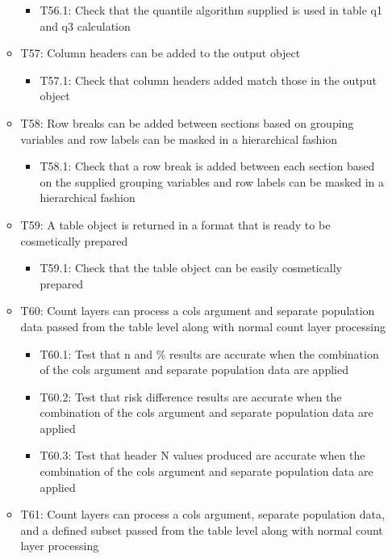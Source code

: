 \documentclass[
]{article}
\providecommand{\tightlist}{%
  \setlength{\itemsep}{0pt}\setlength{\parskip}{0pt}}
\begin{document}
\begin{itemize}
\begin{itemize}
    \begin{itemize}
    \tightlist
    \item
      T56.1: Check that the quantile algorithm supplied is used in table
      q1 and q3 calculation
    \end{itemize}
  \item
    T57: Column headers can be added to the output object

    \begin{itemize}
    \tightlist
    \item
      T57.1: Check that column headers added match those in the output
      object
    \end{itemize}
  \item
    T58: Row breaks can be added between sections based on grouping
    variables and row labels can be masked in a hierarchical fashion

    \begin{itemize}
    \tightlist
    \item
      T58.1: Check that a row break is added between each section based
      on the supplied grouping variables and row labels can be masked in
      a hierarchical fashion
    \end{itemize}
  \item
    T59: A table object is returned in a format that is ready to be
    cosmetically prepared

    \begin{itemize}
    \tightlist
    \item
      T59.1: Check that the table object can be easily cosmetically
      prepared
    \end{itemize}
  \item
    T60: Count layers can process a cols argument and separate
    population data passed from the table level along with normal count
    layer processing

    \begin{itemize}
    \tightlist
    \item
      T60.1: Test that n and \% results are accurate when the
      combination of the cols argument and separate population data are
      applied
    \item
      T60.2: Test that risk difference results are accurate when the
      combination of the cols argument and separate population data are
      applied
    \item
      T60.3: Test that header N values produced are accurate when the
      combination of the cols argument and separate population data are
      applied
    \end{itemize}
  \item
    T61: Count layers can process a cols argument, separate population
    data, and a defined subset passed from the table level along with
    normal count layer processing


\end{itemize}
\end{itemize}
\end{document}
